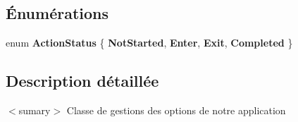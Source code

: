 \subsection*{Énumérations}
\begin{DoxyCompactItemize}
\item 
\hypertarget{namespace_w_p_f_page_switch_a5b81463a65178471232e8abb7c81a2ca}{enum {\bfseries Action\+Status} \{ {\bfseries Not\+Started}, 
{\bfseries Enter}, 
{\bfseries Exit}, 
{\bfseries Completed}
 \}}\label{namespace_w_p_f_page_switch_a5b81463a65178471232e8abb7c81a2ca}

\end{DoxyCompactItemize}


\subsection{Description détaillée}
$<$sumary$>$ Classe de gestions des options de notre application 
